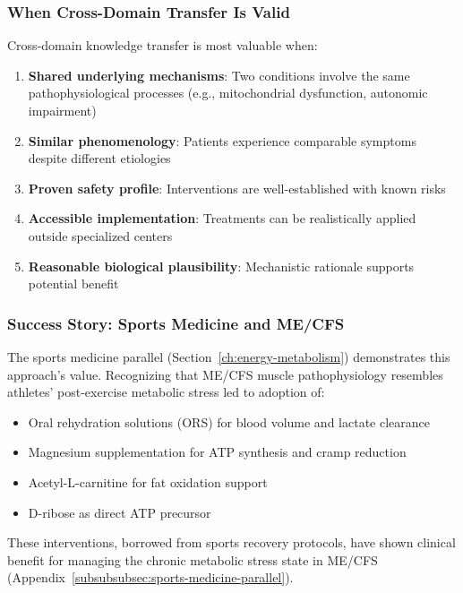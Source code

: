 \subsubsection{When Cross-Domain Transfer Is Valid}

Cross-domain knowledge transfer is most valuable when:

\begin{enumerate}
    \item \textbf{Shared underlying mechanisms}: Two conditions involve the same pathophysiological processes (e.g., mitochondrial dysfunction, autonomic impairment)
    \item \textbf{Similar phenomenology}: Patients experience comparable symptoms despite different etiologies
    \item \textbf{Proven safety profile}: Interventions are well-established with known risks
    \item \textbf{Accessible implementation}: Treatments can be realistically applied outside specialized centers
    \item \textbf{Reasonable biological plausibility}: Mechanistic rationale supports potential benefit
\end{enumerate}

\subsubsection{Success Story: Sports Medicine and ME/CFS}

The sports medicine parallel (Section~\ref{ch:energy-metabolism}) demonstrates this approach's value. Recognizing that ME/CFS muscle pathophysiology resembles athletes' post-exercise metabolic stress led to adoption of:

\begin{itemize}
    \item Oral rehydration solutions (ORS) for blood volume and lactate clearance
    \item Magnesium supplementation for ATP synthesis and cramp reduction
    \item Acetyl-L-carnitine for fat oxidation support
    \item D-ribose as direct ATP precursor
\end{itemize}

These interventions, borrowed from sports recovery protocols, have shown clinical benefit for managing the chronic metabolic stress state in ME/CFS (Appendix~\ref{subsubsubsec:sports-medicine-parallel}).

